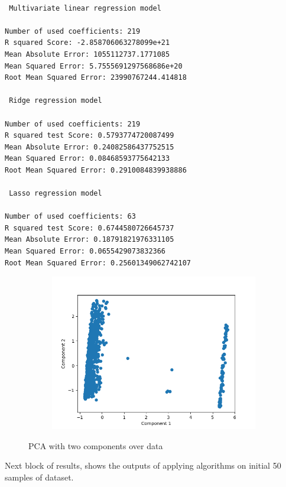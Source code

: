 \documentclass[12pt]{article}
\begin{document}
\begin{lstlisting}

 Multivariate linear regression model

Number of used coefficients: 219
R squared Score: -2.858706063278099e+21
Mean Absolute Error: 1055112737.1771085
Mean Squared Error: 5.7555691297568686e+20
Root Mean Squared Error: 23990767244.414818

 Ridge regression model

Number of used coefficients: 219
R squared test Score: 0.5793774720087499
Mean Absolute Error: 0.24082586437752515
Mean Squared Error: 0.08468593775642133
Root Mean Squared Error: 0.2910084839938886

 Lasso regression model

Number of used coefficients: 63
R squared test Score: 0.6744580726645737
Mean Absolute Error: 0.18791821976331105
Mean Squared Error: 0.0655429073832366
Root Mean Squared Error: 0.25601349062742107
\end{lstlisting}


\begin{figure}[h!]
  \centering
  \begin{subfigure}[b]{0.7\linewidth}
    \includegraphics[width=\linewidth]{./plots/c1-c2.png}    
  \end{subfigure} 
  \caption{PCA with two components over data}
  \label{fig:pca}
\end{figure}


Next block of results, shows the outputs of applying algorithms on initial 50 samples of dataset.
\end{document}
